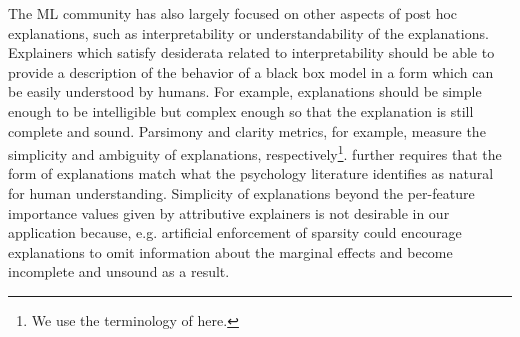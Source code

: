 \documentclass[mnsc,blindrev]{informs3}
\begin{document}
    
  The ML community has also largely focused on other aspects of post hoc explanations, such as interpretability or understandability of the explanations. Explainers which satisfy desiderata related to interpretability should be able to provide a description of the behavior of a black box model in a form which can be easily understood by humans. For example, explanations should be simple enough to be intelligible but complex enough so that the explanation is still complete and sound. Parsimony \citep{nguyen2020quantitative} and clarity \citep{lakkaraju2017interpretable,montavon2018methods,alvarez18robustness} metrics, for example, measure the simplicity and ambiguity of explanations, respectively\footnote{We use the terminology of \cite{markus2021role} here.}. \cite{jacovi2023diagnosing} further requires that the form of explanations match what the psychology literature identifies as natural for human understanding.  Simplicity of explanations beyond the per-feature importance values given by attributive explainers is not desirable in our application because, e.g. artificial enforcement of sparsity could encourage explanations to omit information about the marginal effects and become incomplete and unsound as a result. %
\end{document}
